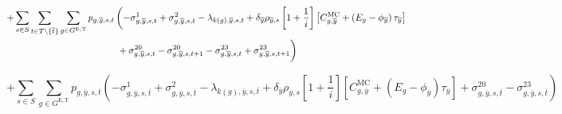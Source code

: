 \documentclass{article}
\newcommand{\sGeneratorsExistingThermal}{G^{\mathrm{E,T}}}
\newcommand{\sScenarios}{S}
\newcommand{\sIntervals}{T}
\newcommand{\iGenerator}{g}
\newcommand{\iYear}{y}
\newcommand{\iYearTerminal}{\overline{\iYear}}
\newcommand{\iScenario}{s}
\newcommand{\iInterval}{t}
\newcommand{\iIntervalTerminal}{\overline{\iInterval}}
\newcommand{\iZone}{z}
\newcommand{\cScenarioDuration}[1][\iYear,\iScenario]{\rho_{#1}}
\newcommand{\cMarginalCost}[1][\iGenerator,\iYear]{C^{\mathrm{MC}}_{#1}}
\newcommand{\cEmissionsIntensity}[1][\iGenerator]{E_{#1}}
\newcommand{\cInterestRate}{i}
\newcommand{\cDiscountRate}[1][\iYear]{\delta_{#1}}
\newcommand{\vBaseline}[1][\iYear]{\phi_{#1}}
\newcommand{\vPermitPrice}[1][\iYear]{\tau_{#1}}
\newcommand{\vPower}[1][\iGenerator,\iYear,\iScenario,\iInterval]{p_{#1}}
\newcommand{\dMinPowerOutput}[1][\iGenerator,\iYear,\iScenario,\iInterval]{\sigma_{#1}^{1}}
\newcommand{\dMaxPowerOutputExistingThermal}[1][\iGenerator,\iYear,\iScenario,\iInterval]{\sigma_{#1}^{2}}
\newcommand{\dRampRateUp}[1][\iGenerator,\iYear,\iScenario,\iInterval]{\sigma_{#1}^{20}}
\newcommand{\dRampRateDown}[1][\iGenerator,\iYear,\iScenario,\iInterval]{\sigma_{#1}^{23}}
\newcommand{\dPowerBalance}[1][\iZone,\iYear,\iScenario,\iInterval]{\lambda_{#1}}
\begin{document}
\begin{align}
	+ \sum\limits_{\iScenario \in \sScenarios} \sum\limits_{\iInterval \in \sIntervals \setminus \{\iIntervalTerminal\}} \sum\limits_{\iGenerator \in \sGeneratorsExistingThermal} \vPower[\iGenerator,\iYearTerminal,\iScenario,\iInterval] & \left(-\dMinPowerOutput[\iGenerator,\iYearTerminal,\iScenario,\iInterval] + \dMaxPowerOutputExistingThermal[\iGenerator,\iYearTerminal,\iScenario,\iInterval] - \dPowerBalance[k(\iGenerator),\iYearTerminal,\iScenario,\iInterval] + \cDiscountRate[\iYearTerminal] \cScenarioDuration[\iYearTerminal,\iScenario] \left[1 + \frac{1}{\cInterestRate}\right] \left[\cMarginalCost[\iGenerator,\iYearTerminal] + \left(\cEmissionsIntensity - \vBaseline[\iYearTerminal]\right)\vPermitPrice[\iYearTerminal] \right] \right.\nonumber\\
	& \left. \vphantom{1 + \frac{1}{\cInterestRate}} + \dRampRateUp[\iGenerator,\iYearTerminal,\iScenario,\iInterval] - \dRampRateUp[\iGenerator,\iYearTerminal,\iScenario,\iInterval + 1] - \dRampRateDown[\iGenerator,\iYearTerminal,\iScenario,\iInterval] + \dRampRateDown[\iGenerator,\iYearTerminal,\iScenario,\iInterval + 1]
	\right)\nonumber\\
\end{align}

\begin{equation}
	+ \sum\limits_{\iScenario \in \sScenarios} \sum\limits_{\iGenerator \in \sGeneratorsExistingThermal} \vPower[\iGenerator,\iYearTerminal,\iScenario,\iIntervalTerminal] \left(-\dMinPowerOutput[\iGenerator,\iYearTerminal,\iScenario,\iIntervalTerminal] + \dMaxPowerOutputExistingThermal[\iGenerator,\iYearTerminal,\iScenario,\iIntervalTerminal] - \dPowerBalance[k(\iGenerator),\iYearTerminal,\iScenario,\iIntervalTerminal] + \cDiscountRate[\iYearTerminal] \cScenarioDuration[\iYearTerminal,\iScenario] \left[1 + \frac{1}{\cInterestRate}\right] \left[\cMarginalCost[\iGenerator,\iYearTerminal] + \left(\cEmissionsIntensity - \vBaseline[\iYearTerminal]\right)\vPermitPrice[\iYearTerminal] \right] + \dRampRateUp[\iGenerator,\iYearTerminal,\iScenario,\iIntervalTerminal] - \dRampRateDown[\iGenerator,\iYearTerminal,\iScenario,\iIntervalTerminal] \right)
\end{equation}
\end{document}

